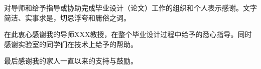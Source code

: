\begin{thesisthanks}
    对导师和给予指导或协助完成毕业设计（论文）工作的组织和个人表示感谢。文字简洁、实事求是，切忌浮夸和庸俗之词。

    在此衷心感谢我的导师XXX教授，在整个毕业设计过程中给予的悉心指导。同时感谢实验室的同学们在技术上给予的帮助。

    最后感谢我的家人一直以来的支持与鼓励。
\end{thesisthanks}